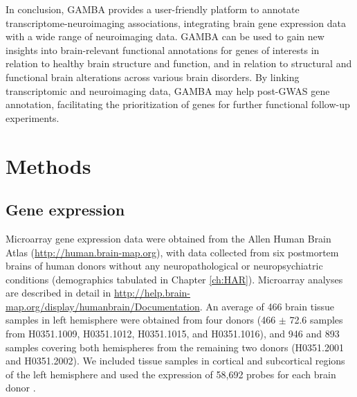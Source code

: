 \begin{refsection}
In conclusion, GAMBA provides a user-friendly platform to annotate transcriptome-neuroimaging associations, integrating brain gene expression data with a wide range of neuroimaging data. GAMBA can be used to gain new insights into brain-relevant functional annotations for genes of interests in relation to healthy brain structure and function, and in relation to structural and functional brain alterations across various brain disorders. By linking transcriptomic and neuroimaging data, GAMBA may help post-GWAS gene annotation, facilitating the prioritization of genes for further functional follow-up experiments. 

\section*{Methods}

\subsection*{Gene expression}
Microarray gene expression data were obtained from the Allen Human Brain Atlas (\url{http://human.brain-map.org}), with data collected from six postmortem brains of human donors without any neuropathological or neuropsychiatric conditions (demographics tabulated in Chapter \ref{ch:HAR}). Microarray analyses are described in detail in \url{http://help.brain-map.org/display/humanbrain/Documentation}. An average of 466 brain tissue samples in left hemisphere were obtained from four donors (466 $\mathsf{\pm}$ 72.6 samples from H0351.1009, H0351.1012, H0351.1015, and H0351.1016), and 946 and 893 samples covering both hemispheres from the remaining two donors (H0351.2001 and H0351.2002). We included tissue samples in cortical and subcortical regions of the left hemisphere and used the expression of 58,692 probes for each brain donor \citep{Romme2017ConnectomeDA,Wei2019GeneticMA}.


\end{refsection}

